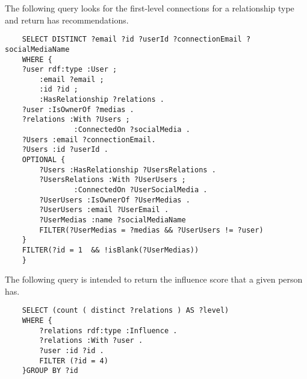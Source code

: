 The following query looks for the first-level connections for a relationship type and return has recommendations.

\begin{verbatim}
    SELECT DISTINCT ?email ?id ?userId ?connectionEmail ?socialMediaName
    WHERE { 
    ?user rdf:type :User ;
        :email ?email ;
        :id ?id ;
        :HasRelationship ?relations .
    ?user :IsOwnerOf ?medias .
    ?relations :With ?Users ;
                :ConnectedOn ?socialMedia .
    ?Users :email ?connectionEmail.
    ?Users :id ?userId .
    OPTIONAL {
        ?Users :HasRelationship ?UsersRelations .
        ?UsersRelations :With ?UserUsers ;
                :ConnectedOn ?UserSocialMedia .
        ?UserUsers :IsOwnerOf ?UserMedias .
        ?UserUsers :email ?UserEmail .
        ?UserMedias :name ?socialMediaName
        FILTER(?UserMedias = ?medias && ?UserUsers != ?user)
    }
    FILTER(?id = 1  && !isBlank(?UserMedias))
    }
\end{verbatim}


The following query is intended to return the influence score that a given person has.

\begin{verbatim}
    SELECT (count ( distinct ?relations ) AS ?level)
    WHERE {
        ?relations rdf:type :Influence .
        ?relations :With ?user .
        ?user :id ?id .
        FILTER (?id = 4)
    }GROUP BY ?id
\end{verbatim}


